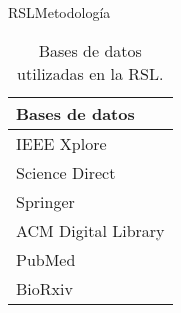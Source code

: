 \documentclass[10pt]{beamer}
\newcommand{\1}{
	\setbeamertemplate{background}{
		\texttt{[image: img/1]}
		\tikz[overlay] \fill[fill opacity=0.75,fill=white] (0,0) rectangle (-\paperwidth,\paperheight);
	}
}
\begin{document}
\begin{frame}{RSL}{Metodología}
	
	\begin{table}[H]
		\centering
		\begin{center}
			\caption{Bases de datos utilizadas en la RSL.}
			\label{tab:bd_RSL}
			\setlength{\tabcolsep}{0.5em} %
			{\renewcommand{\arraystretch}{1.2}%
				\begin{tabular}{p{3cm}}
					\textbf{Bases de datos} \\ \hline
					IEEE Xplore                                                                               \\
					Science Direct \\				
					Springer          \\
					ACM Digital Library                                                                                                             \\	
					PubMed \\ 
					BioRxiv \\ 	
				\end{tabular}
			}
		\end{center}
	\end{table}

\end{frame}
\end{document}
